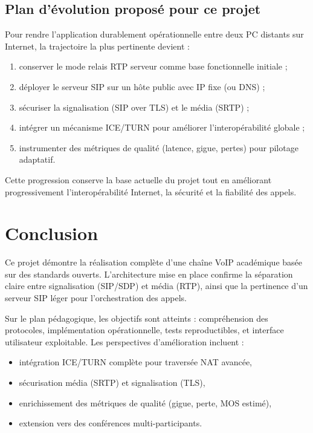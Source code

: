 \documentclass[12pt,a4paper]{article}
\begin{document}
\subsection{Plan d'évolution proposé pour ce projet}

Pour rendre l'application durablement opérationnelle entre deux PC distants sur Internet, la trajectoire la plus pertinente devient :
\begin{enumerate}[leftmargin=1.2cm]
    \item conserver le mode relais RTP serveur comme base fonctionnelle initiale ;
    \item déployer le serveur SIP sur un hôte public avec IP fixe (ou DNS) ;
    \item sécuriser la signalisation (SIP over TLS) et le média (SRTP) ;
    \item intégrer un mécanisme ICE/TURN pour améliorer l'interopérabilité globale ;
    \item instrumenter des métriques de qualité (latence, gigue, pertes) pour pilotage adaptatif.
\end{enumerate}

Cette progression conserve la base actuelle du projet tout en améliorant progressivement l'interopérabilité Internet, la sécurité et la fiabilité des appels.

\section{Conclusion}

Ce projet démontre la réalisation complète d'une chaîne VoIP académique basée sur des standards ouverts. L'architecture mise en place confirme la séparation claire entre signalisation (SIP/SDP) et média (RTP), ainsi que la pertinence d'un serveur SIP léger pour l'orchestration des appels.

Sur le plan pédagogique, les objectifs sont atteints : compréhension des protocoles, implémentation opérationnelle, tests reproductibles, et interface utilisateur exploitable. Les perspectives d'amélioration incluent :
\begin{itemize}[leftmargin=1.2cm]
    \item intégration ICE/TURN complète pour traversée NAT avancée,
    \item sécurisation média (SRTP) et signalisation (TLS),
    \item enrichissement des métriques de qualité (gigue, perte, MOS estimé),
    \item extension vers des conférences multi-participants.
\end{itemize}
\end{document}
